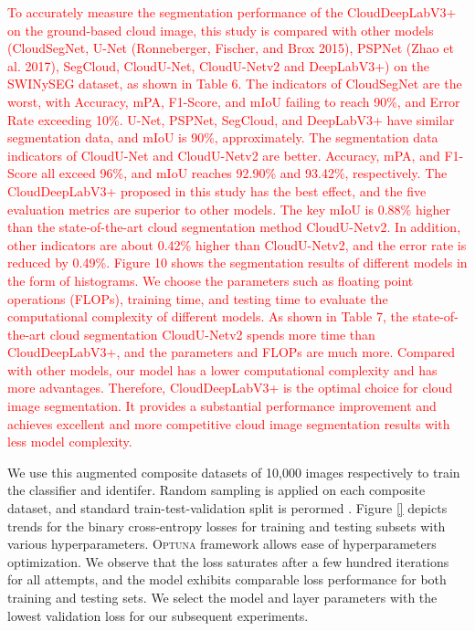 \documentclass[amt, article]{copernicus}
\begin{document}
\textcolor{red}{To accurately measure the segmentation performance of the CloudDeepLabV3+ on the ground-based cloud image, this study is compared with other models (CloudSegNet, U-Net (Ronneberger, Fischer, and Brox 2015), PSPNet (Zhao et al. 2017), SegCloud, CloudU-Net, CloudU-Netv2 and DeepLabV3+) on the SWINySEG dataset, as shown in Table 6.
The indicators of CloudSegNet are the worst, with Accuracy, mPA, F1-Score, and mIoU failing to reach 90\%, and Error Rate exceeding 10\%. U-Net, PSPNet, SegCloud, and DeepLabV3+ have similar segmentation data, and mIoU is 90\%, approximately. The segmentation data indicators of CloudU-Net and CloudU-Netv2 are better. Accuracy, mPA, and F1-Score all exceed 96\%, and mIoU reaches 92.90\% and 93.42\%, respectively. The CloudDeepLabV3+ proposed in this study has the best effect, and the five evaluation metrics are superior to other models. The key mIoU is 0.88\% higher than the state-of-the-art cloud segmentation method CloudU-Netv2. In addition, other indicators are about 0.42\% higher than CloudU-Netv2, and the error rate is reduced by 0.49\%. Figure 10 shows the segmentation results of different models in the form of histograms. We choose the parameters such as floating point operations (FLOPs), training time, and testing time to evaluate the computational complexity of different models. As shown in Table 7, the state-of-the-art cloud segmentation CloudU-Netv2 spends more time than CloudDeepLabV3+, and the parameters and FLOPs are much more. Compared with other models, our model has a lower computational complexity and has more advantages. Therefore, CloudDeepLabV3+ is the optimal choice for cloud image segmentation. It provides a substantial performance improvement and achieves excellent and more competitive cloud image segmentation results with less model complexity.}

We use this augmented composite datasets of 10,000 images respectively to train the classifier and identifer. Random sampling is applied on each composite dataset, and standard train-test-validation split is perormed . Figure \ref{} depicts trends for the binary cross-entropy losses for training and testing subsets with various hyperparameters. \textsc{Optuna} framework allows ease of hyperparameters optimization. We observe that the loss saturates after a few hundred iterations for all attempts, and the model exhibits comparable loss performance for both training and testing sets. We select the model and layer parameters with the lowest validation loss for our subsequent experiments.
\end{document}
